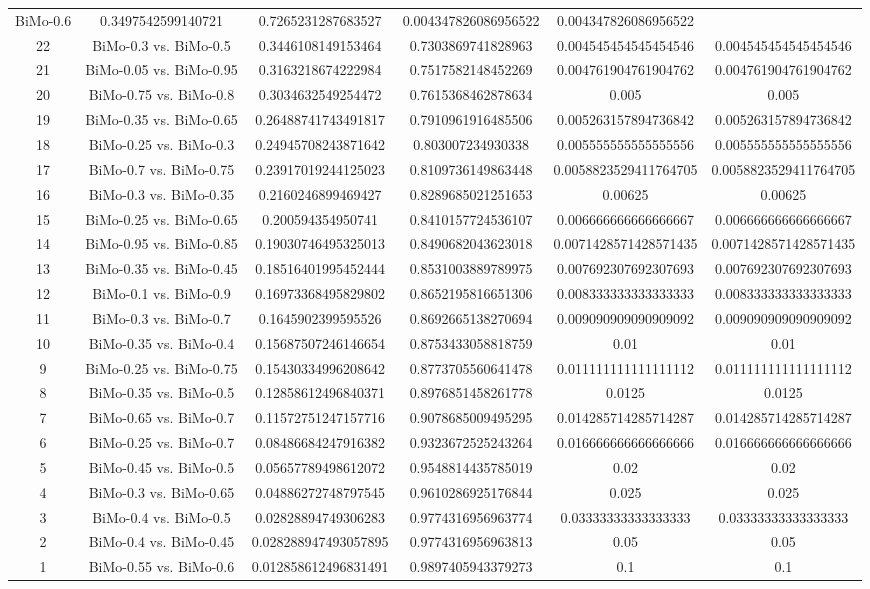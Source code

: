 \documentclass[a4paper,10pt]{article}
\begin{document}
\begin{landscape}
\begin{table}[!htp]
\begin{tabular}{cccccc}
BiMo-0.6&0.3497542599140721&0.7265231287683527&0.004347826086956522&0.004347826086956522\\22&BiMo-0.3 vs. BiMo-0.5&0.3446108149153464&0.7303869741828963&0.004545454545454546&0.004545454545454546\\21&BiMo-0.05 vs. BiMo-0.95&0.3163218674222984&0.7517582148452269&0.004761904761904762&0.004761904761904762\\20&BiMo-0.75 vs. BiMo-0.8&0.3034632549254472&0.7615368462878634&0.005&0.005\\19&BiMo-0.35 vs. BiMo-0.65&0.26488741743491817&0.7910961916485506&0.005263157894736842&0.005263157894736842\\18&BiMo-0.25 vs. BiMo-0.3&0.24945708243871642&0.803007234930338&0.005555555555555556&0.005555555555555556\\17&BiMo-0.7 vs. BiMo-0.75&0.23917019244125023&0.8109736149863448&0.0058823529411764705&0.0058823529411764705\\16&BiMo-0.3 vs. BiMo-0.35&0.2160246899469427&0.8289685021251653&0.00625&0.00625\\15&BiMo-0.25 vs. BiMo-0.65&0.200594354950741&0.8410157724536107&0.006666666666666667&0.006666666666666667\\14&BiMo-0.95 vs. BiMo-0.85&0.19030746495325013&0.8490682043623018&0.0071428571428571435&0.0071428571428571435\\13&BiMo-0.35 vs. BiMo-0.45&0.18516401995452444&0.8531003889789975&0.007692307692307693&0.007692307692307693\\12&BiMo-0.1 vs. BiMo-0.9&0.16973368495829802&0.8652195816651306&0.008333333333333333&0.008333333333333333\\11&BiMo-0.3 vs. BiMo-0.7&0.1645902399595526&0.8692665138270694&0.009090909090909092&0.009090909090909092\\10&BiMo-0.35 vs. BiMo-0.4&0.15687507246146654&0.8753433058818759&0.01&0.01\\9&BiMo-0.25 vs. BiMo-0.75&0.15430334996208642&0.8773705560641478&0.011111111111111112&0.011111111111111112\\8&BiMo-0.35 vs. BiMo-0.5&0.12858612496840371&0.8976851458261778&0.0125&0.0125\\7&BiMo-0.65 vs. BiMo-0.7&0.11572751247157716&0.9078685009495295&0.014285714285714287&0.014285714285714287\\6&BiMo-0.25 vs. BiMo-0.7&0.08486684247916382&0.9323672525243264&0.016666666666666666&0.016666666666666666\\5&BiMo-0.45 vs. BiMo-0.5&0.05657789498612072&0.9548814435785019&0.02&0.02\\4&BiMo-0.3 vs. BiMo-0.65&0.04886272748797545&0.9610286925176844&0.025&0.025\\3&BiMo-0.4 vs. BiMo-0.5&0.02828894749306283&0.9774316956963774&0.03333333333333333&0.03333333333333333\\2&BiMo-0.4 vs. BiMo-0.45&0.028288947493057895&0.9774316956963813&0.05&0.05\\1&BiMo-0.55 vs. BiMo-0.6&0.012858612496831491&0.9897405943379273&0.1&0.1\\\hline

\end{tabular}
\end{table}
\end{landscape}
\end{document}
